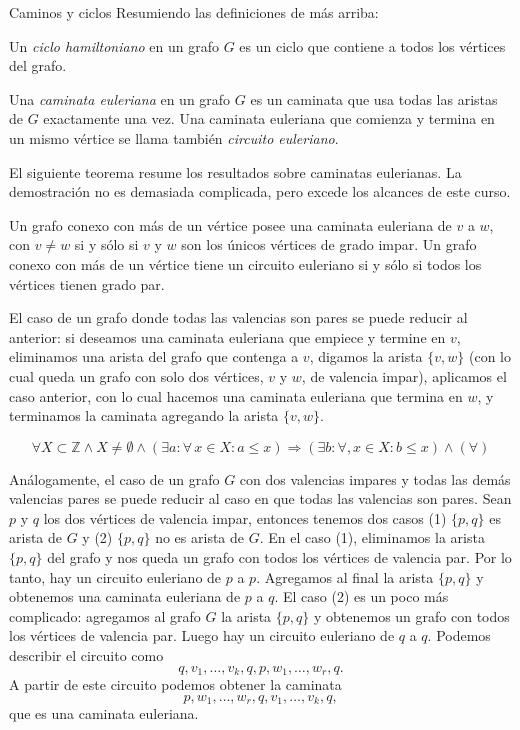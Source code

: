 \begin{section}{Caminos y ciclos}
Resumiendo las definiciones de más arriba:

\begin{definicion}
Un \textit{ciclo hamiltoniano} en un grafo $G$ es un ciclo que contiene a todos los vértices del grafo.

Una \textit{caminata euleriana} en un grafo $G$ es un caminata que usa todas las aristas de $G$ exactamente
una vez. Una caminata euleriana que comienza y termina en un mismo vértice se llama también \textit{circuito euleriano}.
\end{definicion}

El siguiente teorema resume los resultados sobre caminatas eulerianas. La demostración no es demasiada complicada, pero excede los alcances de este curso.  

\begin{teorema}\label{th-caminata-euleriana} Un grafo conexo con más de un vértice posee una caminata euleriana de $v$ a $w$, con $v \not= w$ si y sólo si $v$ y $w$ son los únicos vértices de grado impar. Un grafo conexo con más de un vértice tiene un circuito euleriano si y sólo si todos los vértices tienen grado par.
\end{teorema}

\begin{observacion}\label{obs-par-a-impar}
    El caso de un grafo donde todas las valencias son pares se puede reducir al anterior: si deseamos una caminata euleriana que empiece y termine en $v$, eliminamos una arista del grafo que contenga a $v$, digamos la arista $\{v,w\}$ (con lo cual queda un grafo  con solo dos vértices, $v$ y $w$, de valencia impar), aplicamos el caso  anterior, con lo cual hacemos una caminata euleriana que termina en  $w$, y terminamos la caminata agregando  la arista $\{v,w\}$. 
\end{observacion}

$$
\forall X \subset \mathbb Z \wedge X \ne \emptyset \wedge (\exists a: \forall\, x \in X: a \le x) \Rightarrow (\exists b: \forall, x \in X :b \le x) \wedge (\forall)
$$
\begin{observacion}\label{obs-impar-a-par}
    Análogamente,  el caso de un grafo  $G$ con dos valencias impares y todas las demás valencias pares  se puede reducir al caso en que todas las valencias son pares. Sean $p$ y $q$ los dos vértices de valencia impar,  entonces tenemos dos casos (1) $\{p,q\}$  es arista de $G$ y (2) $\{p,q\}$  no es arista de $G$.  En el caso (1),  eliminamos la arista  $\{p,q\}$  del grafo  y  nos queda un grafo  con todos los vértices de valencia par. Por lo tanto, hay un circuito euleriano de $p$  a $p$. Agregamos al final la arista $\{p,q\}$  y obtenemos una caminata euleriana de  $p$ a $q$. El caso (2) es un poco más complicado: agregamos al grafo $G$ la arista $\{p,q\}$ y obtenemos un grafo  con todos los vértices de valencia par. Luego  hay un circuito euleriano de $q$ a $q$. Podemos describir el circuito como
    $$
    q,v_1,\ldots,v_k,q,p,w_1,\ldots,w_r,q.
    $$
    A partir de este circuito podemos obtener la caminata
    $$
    p,w_1,\ldots,w_r,q,v_1,\ldots,v_k,q, 
    $$
    que es una caminata euleriana. 
\end{observacion}


\end{section}
